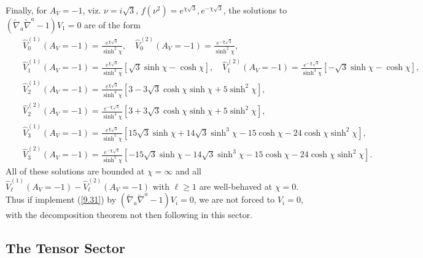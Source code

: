\documentclass[aps,onecolumn,10pt]{revtex4}
\numberwithin{equation}{section}
\numberwithin{equation}{section}
\begin{document}
Finally, for $A_V=-1$, viz. $\nu=i\surd{3}$, $f(\nu^2)=e^{\chi\surd{3}},e^{-\chi\surd{3}}$, the solutions to $(\tilde{\nabla}_a\tilde{\nabla}^a-1)V_1=0$ are of the form
%
\begin{eqnarray}
&&\hat{V}^{(1)}_0(A_V=-1)=\frac{e^{\chi\surd{3}}}{\sinh^2\chi},\quad \hat{V}^{(2)}_0(A_V=-1)=\frac{e^{-\chi\surd{3}}}{\sinh^2\chi},
\nonumber\\
&&\hat{V}^{(1)}_1(A_V=-1)=\frac{e^{\chi\surd{3}}}{\sinh^3\chi}\left[\surd{3}\sinh\chi-\cosh\chi\right],\quad \hat{V}^{(2)}_1(A_V=-1)=\frac{e^{-\chi\surd{3}}}{\sinh^3\chi}\left[-\surd{3}\sinh\chi-\cosh\chi\right],
\nonumber\\
&&\hat{V}^{(1)}_2(A_V=-1)=\frac{e^{\chi\surd{3}}}{\sinh^4\chi}\left[3-3\surd{3}\cosh\chi\sinh\chi+5\sinh^2\chi
\right],
\nonumber\\
 &&\hat{V}^{(2)}_2(A_V=-1)=\frac{e^{-\chi\surd{3}}}{\sinh^4\chi}\left[3+3\surd{3}\cosh\chi\sinh\chi+5\sinh^2\chi\right],
\nonumber\\
&&\hat{V}^{(1)}_3(A_V=-1)=\frac{e^{\chi\surd{3}}}{\sinh^5\chi}\left[15\surd{3}\sinh\chi+14\surd{3}\sinh^3\chi
-15\cosh\chi-24\cosh\chi\sinh^2\chi\right],
\nonumber\\
&&\hat{V}^{(2)}_3(A_V=-1)=\frac{e^{-\chi\surd{3}}}{\sinh^5\chi}\left[-15\surd{3}\sinh\chi-14\surd{3}\sinh^3\chi
-15\cosh\chi-24\cosh\chi\sinh^2\chi\right].
\label{10.30b}
\end{eqnarray}
%
All of these solutions are bounded at $\chi=\infty$ and all $\hat{V}^{(1)}_{\ell}(A_V=-1)-\hat{V}^{(2)}_{\ell}(A_V=-1)$ with $\ell\geq 1$ are well-behaved at $\chi=0$.  Thus if implement (\ref{9.31}) by $(\tilde{\nabla}_a\tilde{\nabla}^a-1)V_i=0$,  we are not forced to $V_i=0$, with the decomposition theorem not then following in this sector.



\subsection{The Tensor Sector}
\end{document}

